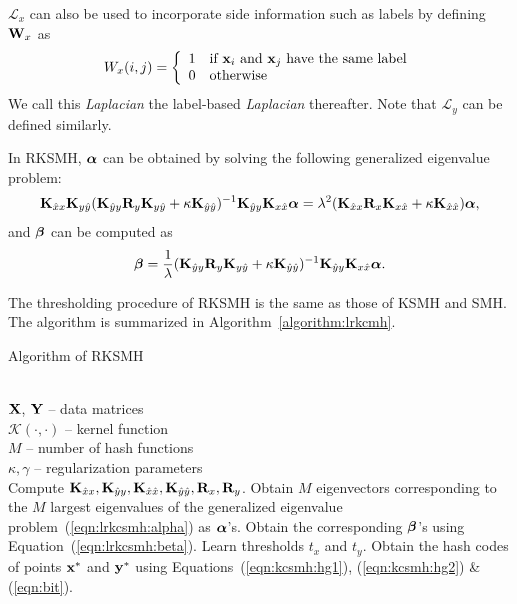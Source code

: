 $\mathcal{L}_{x}$ can also be used to incorporate side information such as labels by defining ${\bf W}_{x}$ as
\begin{align}
\label{eqn:wlabel}
W_{x}(i,j) = \left\{ \begin{array}{ll}
1 & \textrm{if ${\bf x}_i$ and ${\bf x}_j$ have the same label}\\
0 & \textrm{otherwise}
\end{array} \right.
\end{align}
We call this \textit{Laplacian} the label-based \textit{Laplacian} thereafter. Note that $\mathcal{L}_{y}$ can be defined similarly.

In \mbox{RKSMH}, $\mbox{\boldmath$\alpha$\unboldmath}$ can be obtained by solving the following generalized eigenvalue problem:
\begin{align}
\label{eqn:lrkcsmh:alpha}
{\bf K}_{\hat{x}x}{\bf K}_{y\hat{y}}({\bf K}_{\hat{y}y}{\bf R}_{y}{\bf K}_{y\hat{y}} + \kappa{\bf K}_{\hat{y}\hat{y}})^{-1}{\bf K}_{\hat{y}y}{\bf K}_{x\hat{x}}\mbox{\boldmath$\alpha$\unboldmath}= \lambda^2({\bf K}_{\hat{x}x}{\bf R}_{x}{\bf K}_{x\hat{x}} + \kappa{\bf K}_{\hat{x}\hat{x}})\mbox{\boldmath$\alpha$\unboldmath},
\end{align}
and $\mbox{\boldmath$\beta$\unboldmath}$ can be computed as
\begin{align}
\label{eqn:lrkcsmh:beta}
\mbox{\boldmath$\beta$\unboldmath} =\frac{1}{\lambda} ({\bf K}_{\hat{y}y}{\bf R}_{y}{\bf K}_{y\hat{y}}+\kappa{\bf K}_{\hat{y}\hat{y}})^{-1}{\bf K}_{\hat{y}y}{\bf K}_{x\hat{x}}\mbox{\boldmath$\alpha$\unboldmath}.
\end{align}


The thresholding procedure of \mbox{RKSMH} is the same as those of \mbox{KSMH} and \mbox{SMH}. The algorithm is summarized in Algorithm~\ref{algorithm:lrkcmh}.

\begin{algorithm}[htb]
\caption{Algorithm of \mbox{RKSMH}}
\label{algorithm:lrkcmh}
\begin{algorithmic}
 \\
${\bf X}$, ${\bf Y}$ -- data matrices
\\$\mathcal{K}(\cdot,\cdot)$ -- kernel function
\\ $M$ -- number of hash functions
\\ $\kappa,\gamma$ -- regularization parameters
 \\

  \STATE Compute ${\bf K}_{\hat{x}x}, {\bf K}_{\hat{y}y}, {\bf K}_{\hat{x}\hat{x}}, {\bf K}_{\hat{y}\hat{y}}, {\bf R}_{x},{\bf R}_{y}$.
   \STATE Obtain $M$ eigenvectors corresponding to the $M$ largest eigenvalues of the generalized eigenvalue problem~(\ref{eqn:lrkcsmh:alpha}) as $\mbox{\boldmath$\alpha$\unboldmath}$'s.
   \STATE Obtain the corresponding $\mbox{\boldmath$\beta$\unboldmath}$'s using Equation~(\ref{eqn:lrkcsmh:beta}).
   \STATE Learn thresholds $ t_x $ and $ t_y $.
  \STATE  Obtain the hash codes of points ${\bf x}^{*}$ and ${\bf y}^{*}$ using Equations~(\ref{eqn:kcsmh:hg1}), (\ref{eqn:kcsmh:hg2}) \& (\ref{eqn:bit}).
\end{algorithmic}
\end{algorithm}

